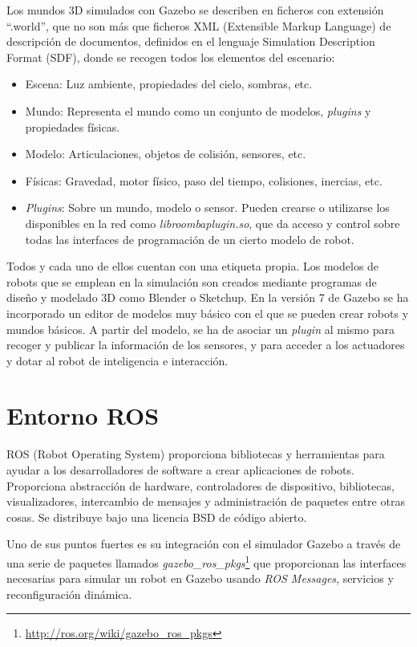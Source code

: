 Los mundos 3D simulados con Gazebo se describen en ficheros con extensión “.world”, que no son más que ficheros XML (Extensible Markup Language) de descripción de documentos, definidos en el lenguaje Simulation Description Format (SDF), donde se recogen todos los elementos del escenario:

\begin{itemize}
	\item Escena: Luz ambiente, propiedades del cielo, sombras, etc.
	\item Mundo: Representa el mundo como un conjunto de modelos, \textit{plugins} y propiedades físicas.
	\item Modelo: Articulaciones, objetos de colisión, sensores, etc.
	\item Físicas: Gravedad, motor físico, paso del tiempo, colisiones, inercias, etc.
	\item \textit{Plugins}: Sobre un mundo, modelo o sensor. Pueden crearse o utilizarse los disponibles en la red como \textit{libroombaplugin.so}, que da acceso y control sobre todas las interfaces de programación de un cierto modelo de robot.
\end{itemize}

Todos y cada uno de ellos cuentan con una etiqueta propia. Los modelos de robots que se emplean en la simulación son creados mediante programas de diseño y modelado 3D como Blender o Sketchup. En la versión 7 de Gazebo se ha incorporado un editor de modelos muy básico con el que se pueden crear robots y mundos básicos. A partir del modelo, se ha de asociar un \textit{plugin} al mismo para recoger y publicar la información de los sensores, y para acceder a los actuadores y dotar al robot de inteligencia e interacción.

\section{Entorno ROS}
ROS (Robot Operating System) proporciona bibliotecas y herramientas para ayudar a los desarrolladores de software a crear aplicaciones de robots. Proporciona abstracción de hardware, controladores de dispositivo, bibliotecas, visualizadores, intercambio de mensajes y administración de paquetes entre otras cosas. Se distribuye bajo una licencia BSD de código abierto.

Uno de sus puntos fuertes es su integración con el simulador Gazebo a través de una serie de paquetes llamados \textit{gazebo\_ros\_pkgs}\footnote{\url{http://ros.org/wiki/gazebo\_ros\_pkgs}} que proporcionan las interfaces necesarias para simular un robot en Gazebo usando \textit{ROS Messages}, servicios y reconfiguración dinámica.

